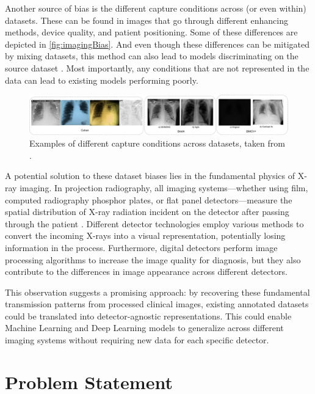 \documentclass[nomenclature, english, bibtex]{kththesis}
\numberwithin{listing}{chapter}
\begin{document}
Another source of bias is the different capture conditions across (or even within) datasets. These can be found
in images that go through different enhancing methods, device quality, and patient positioning. Some of these
differences are depicted in \autoref{fig:imagingBias}. And even though these differences can be mitigated by
mixing datasets, this method can also lead to models discriminating on the source dataset \cite{arias-garzonBiasesAssociatedDatabase2023}.
Most importantly, any conditions that are not represented in the data can lead to existing models performing poorly.

\begin{figure}
    \centering
    \includegraphics[width=\textwidth]{figures/imaging_bias.jpeg}
    \caption{Examples of different capture conditions across datasets, taken from \cite[Figure~6]{arias-garzonBiasesAssociatedDatabase2023}.}
    \label{fig:imagingBias}
\end{figure}

A potential solution to these dataset biases lies in the fundamental physics of X-ray imaging.
In projection radiography, all imaging systems—whether using film, computed radiography phosphor plates, or flat panel
detectors—measure the spatial distribution of X-ray radiation incident on the detector after passing through
the patient \cite{Seibert3}. Different detector technologies employ various methods to convert the incoming X-rays
into a visual representation, potentially losing information in the process. Furthermore, digital
detectors perform image processing algorithms to increase the image quality for diagnosis, but they also contribute to the
differences in image appearance across different detectors.

This observation suggests a promising approach: by recovering these fundamental transmission patterns from
processed clinical images, existing annotated datasets could be translated into detector-agnostic representations.
This could enable Machine Learning and Deep Learning models to generalize across different imaging systems without
requiring new data for each specific detector.

\section{Problem Statement}
\end{document}
